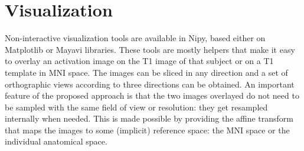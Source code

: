 \documentclass{bioinfo}
\begin{document}
\section{Visualization}
Non-interactive visualization tools are available in Nipy, based
either on Matplotlib or Mayavi libraries.
%
These tools are mostly helpers that make it easy to overlay an
activation image on the T1 image of that subject or on a T1 template
in MNI space.
%
The images can be sliced in any direction and a set of orthographic
views according to three directions can be obtained.
%
An important feature of the proposed approach is that the two images
overlayed do not need to be sampled with the same field of view or
resolution: they get resampled internally when needed. 
%
This is made possible by providing the affine transform that maps the
images to some (implicit) reference space: the MNI space or the
individual anatomical space.

\end{document}

